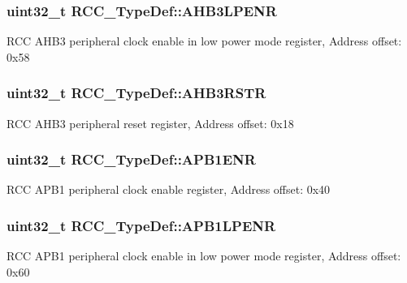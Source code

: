 \subsubsection[{\texorpdfstring{A\+H\+B3\+L\+P\+E\+NR}{AHB3LPENR}}]{ uint32\+\_\+t R\+C\+C\+\_\+\+Type\+Def\+::\+A\+H\+B3\+L\+P\+E\+NR}\hypertarget{struct_r_c_c___type_def_a95edda857c3725bfb410d3a4707edfd8}{}\label{struct_r_c_c___type_def_a95edda857c3725bfb410d3a4707edfd8}
R\+CC A\+H\+B3 peripheral clock enable in low power mode register, Address offset\+: 0x58 
\subsubsection[{\texorpdfstring{A\+H\+B3\+R\+S\+TR}{AHB3RSTR}}]{ uint32\+\_\+t R\+C\+C\+\_\+\+Type\+Def\+::\+A\+H\+B3\+R\+S\+TR}\hypertarget{struct_r_c_c___type_def_a39a90d838fbd0b8515f03e4a1be6374f}{}\label{struct_r_c_c___type_def_a39a90d838fbd0b8515f03e4a1be6374f}
R\+CC A\+H\+B3 peripheral reset register, Address offset\+: 0x18 
\subsubsection[{\texorpdfstring{A\+P\+B1\+E\+NR}{APB1ENR}}]{ uint32\+\_\+t R\+C\+C\+\_\+\+Type\+Def\+::\+A\+P\+B1\+E\+NR}\hypertarget{struct_r_c_c___type_def_aec7622ba90341c9faf843d9ee54a759f}{}\label{struct_r_c_c___type_def_aec7622ba90341c9faf843d9ee54a759f}
R\+CC A\+P\+B1 peripheral clock enable register, Address offset\+: 0x40 
\subsubsection[{\texorpdfstring{A\+P\+B1\+L\+P\+E\+NR}{APB1LPENR}}]{ uint32\+\_\+t R\+C\+C\+\_\+\+Type\+Def\+::\+A\+P\+B1\+L\+P\+E\+NR}\hypertarget{struct_r_c_c___type_def_a5c8e710c40b642dcbf296201a7ecb2da}{}\label{struct_r_c_c___type_def_a5c8e710c40b642dcbf296201a7ecb2da}
R\+CC A\+P\+B1 peripheral clock enable in low power mode register, Address offset\+: 0x60 
